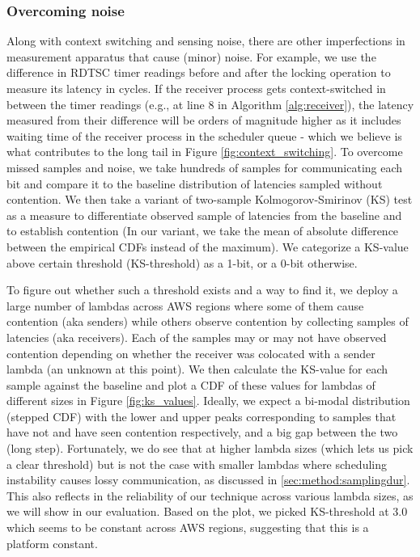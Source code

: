 \subsubsection{Overcoming noise} 
\label{sec:method:noise}
Along with context switching and sensing noise, there are other imperfections in
measurement apparatus that cause (minor) noise. For example, we use the difference
in RDTSC timer readings before and after the locking operation to measure its
latency in cycles. If the receiver process gets context-switched in between the
timer readings (e.g., at line 8 in Algorithm \ref{alg:receiver}), the latency
measured from their difference will be orders of magnitude higher as it includes
waiting time of the receiver process in the scheduler queue - which we believe is what contributes to the long tail in Figure
\ref{fig:context_switching}. To overcome missed samples and noise, we take
hundreds of samples for communicating each bit and compare it to the baseline
distribution of latencies sampled without contention.  We then take a variant
of two-sample Kolmogorov-Smirinov (KS) test as a measure to differentiate
observed sample of latencies from the baseline and to establish contention (In
our variant, we take the mean of absolute difference between the empirical
CDFs instead of the maximum). We categorize a KS-value above certain threshold
(KS-threshold) as a 1-bit, or a 0-bit otherwise. 

To figure out whether such a threshold exists and a way to find it, we deploy a
large number of lambdas across AWS regions where some of them cause contention
(aka senders) while others observe contention by collecting samples of latencies
(aka receivers). Each of the samples may or may not have observed contention
depending on whether the receiver was colocated with a sender lambda (an unknown
at this point). We then calculate the KS-value for each sample against the
baseline and plot a CDF of these values for lambdas of different sizes in Figure
\ref{fig:ks_values}.  Ideally, we expect a bi-modal distribution (stepped CDF)
with the lower and upper peaks corresponding to samples that have not and have
seen contention respectively, and a big gap between the two (long step).
Fortunately, we do see that at higher lambda sizes (which lets us pick a clear
threshold) but is not the case with smaller lambdas where scheduling instability
causes lossy communication, as discussed in \ref{sec:method:samplingdur}.  This
also reflects in the reliability of our technique across various lambda sizes,
as we will show in our evaluation. Based on the plot, we picked KS-threshold at
3.0 which seems to be constant across AWS regions, suggesting that this is a
platform constant.


